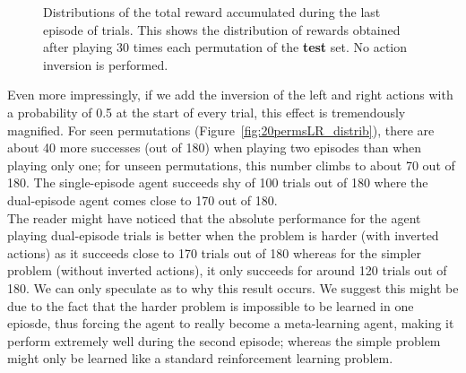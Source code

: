 \begin{figure}
	\centering
	\caption{Distributions of the total reward accumulated during the last
	episode of trials. This shows the distribution of rewards obtained
	after playing 30 times each permutation of the \textbf{test} set. No action
	inversion is performed.}
	\label{fig:20perms_unseen_distrib}
\end{figure}

Even more impressingly, if we add the inversion of the left and right actions
with a probability of 0.5 at the start of every trial, this effect is
tremendously magnified. For seen permutations
(Figure~\ref{fig:20permsLR_distrib}), there are about 40 more successes (out of
180) when playing two episodes than when playing only one; for unseen
permutations, this number climbs to about 70 out of 180. The single-episode
agent succeeds shy of 100 trials out of 180 where the dual-episode agent
comes close to 170 out of 180.\\

The reader might have noticed that the absolute performance for the agent
playing dual-episode trials is better when the problem is harder (with
inverted actions) as it succeeds close to 170 trials out of 180 whereas
for the simpler problem (without inverted actions), it only succeeds for
around 120 trials out of 180. We can only speculate as to why this result
occurs. We suggest this might be due to the fact that the harder problem
is impossible to be learned in one epiosde, thus forcing the agent to
really become a meta-learning agent, making it perform extremely well during
the second episode; whereas the simple problem might only be learned like
a standard reinforcement learning problem.\\

